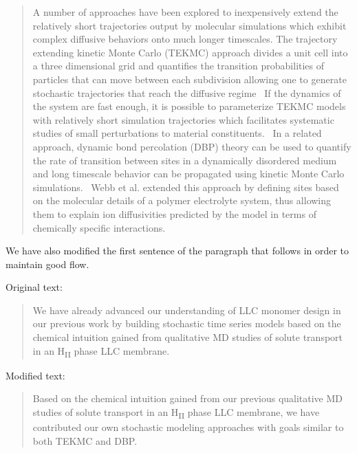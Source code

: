 \documentclass{article}
\begin{document}
\begin{enumerate}[label={Comment \theenumi :}, leftmargin=3.9\parindent]
    \begin{quote}
    A number of approaches have been explored to inexpensively extend the relatively short
    trajectories output by molecular simulations which exhibit complex diffusive behaviors
    onto much longer timescales. The trajectory extending kinetic Monte Carlo (TEKMC) approach
    divides a unit cell into a three dimensional grid and quantifies the transition 
    probabilities of particles that can move between each subdivision allowing one to generate
    stochastic trajectories that reach the diffusive regime~\cite{neyertz_trajectory-extending_2010}
    If the dynamics of the system are fast enough, it is possible to parameterize TEKMC models with
    relatively short simulation trajectories which facilitates systematic studies of small perturbations
    to material constituents.~\cite{hanson_computer_2012}
    In a related approach, dynamic bond percolation (DBP) theory can be used to quantify the
    rate of transition between sites in a dynamically disordered medium and long timescale
    behavior can be propagated using kinetic Monte Carlo simulations.~\cite{druger_dynamic_1983}
    Webb et al. extended this approach by defining sites based on the molecular details of 
    a polymer electrolyte system, thus allowing them to explain ion diffusivities predicted by
    the model in terms of chemically specific interactions.~\cite{webb_chemically_2015}
    \end{quote} 
    
    We have also modified the first sentence of the paragraph that follows in order to maintain
    good flow.
    
    Original text:
    \begin{quote}
    We have already advanced our understanding of LLC monomer design in our previous work
    by building stochastic time series models based on the chemical intuition gained
    from qualitative MD studies of solute transport in an H\textsubscript{II} phase LLC
    membrane.
    \end{quote}
    
    Modified text:
    \begin{quote}
    Based on the chemical intuition gained from our previous qualitative MD studies of 
    solute transport in an H\textsubscript{II} phase LLC membrane, we have contributed our
    own stochastic modeling approaches with goals similar to both TEKMC and DBP.
    \end{quote}


\end{enumerate}
\end{document}
